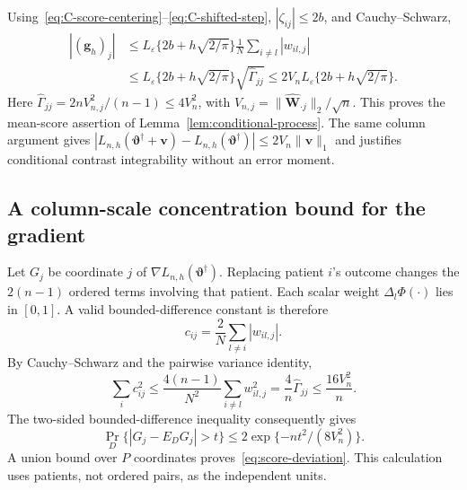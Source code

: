 Using~\eqref{eq:C-score-centering}--\eqref{eq:C-shifted-step}, $|\zeta_{ij}|\le2b$, and Cauchy--Schwarz,
\begin{align*}
 |(\bm{g}_h)_j|
 &\le L_\varepsilon\{2b+h\sqrt{2/\pi}\}
          \frac1N\sum_{i\ne l}|w_{il,j}|\\
 &\le L_\varepsilon\{2b+h\sqrt{2/\pi}\}\sqrt{\widehat\Gamma_{jj}}
 \le2V_nL_\varepsilon\{2b+h\sqrt{2/\pi}\}.
\end{align*}
Here $\widehat\Gamma_{jj}=2nV_{n,j}^2/(n-1)\le4V_n^2$, with $V_{n,j}=\|\widehat{\bm{W}}_{\cdot j}\|_2/\sqrt n$. This proves the mean-score assertion of Lemma~\ref{lem:conditional-process}. The same column argument gives $|L_{n,h}(\bm{\vartheta}^\dagger+\bm{v})-L_{n,h}(\bm{\vartheta}^\dagger)|\le2V_n\|\bm{v}\|_1$ and justifies conditional contrast integrability without an error moment.

\subsection{A column-scale concentration bound for the gradient}
\label{subapp:gradient-proof}
Let $G_j$ be coordinate $j$ of $\nabla L_{n,h}(\bm{\vartheta}^\dagger)$. Replacing patient $i$'s outcome changes the $2(n-1)$ ordered terms involving that patient. Each scalar weight $\Delta_l\Phi(\cdot)$ lies in $[0,1]$. A valid bounded-difference constant is therefore
\[
 c_{ij}=\frac2N\sum_{l\ne i}|w_{il,j}|.
\]
By Cauchy--Schwarz and the pairwise variance identity,
\begin{equation}
 \sum_i c_{ij}^2
 \le\frac{4(n-1)}{N^2}\sum_{i\ne l}w_{il,j}^2
 =\frac4n\widehat\Gamma_{jj}\le\frac{16V_n^2}{n}.
 \label{eq:C-gradient-differences}
\end{equation}
The two-sided bounded-difference inequality consequently gives
\[
 \Pr_D\{|G_j-E_DG_j|>t\}\le2\exp\{-nt^2/(8V_n^2)\}.
\]
A union bound over $P$ coordinates proves~\eqref{eq:score-deviation}. This calculation uses patients, not ordered pairs, as the independent units.

